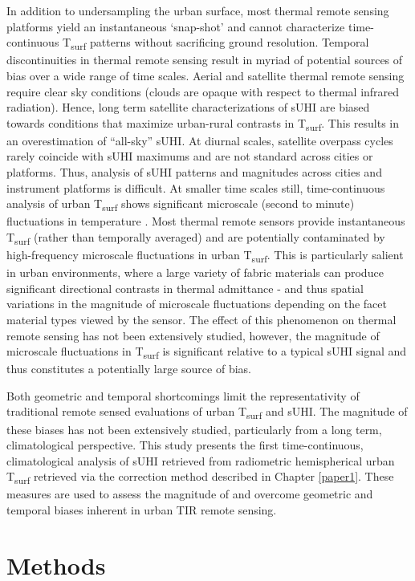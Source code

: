 In addition to undersampling the urban surface, most thermal remote sensing platforms yield an instantaneous ‘snap-shot’ and cannot characterize time-continuous T\textsubscript{surf} patterns without sacrificing ground resolution. Temporal discontinuities in thermal remote sensing result in myriad of potential sources of bias over a wide range of time scales. Aerial and satellite thermal remote sensing require clear sky conditions (clouds are opaque with respect to thermal infrared radiation). Hence, long term satellite characterizations of sUHI are biased towards conditions that maximize urban-rural contrasts in T\textsubscript{surf}. This results in an overestimation of “all-sky” sUHI. At diurnal scales, satellite overpass cycles rarely coincide with sUHI maximums and are not standard across cities or platforms. Thus, analysis of sUHI patterns and magnitudes across cities and instrument platforms is difficult. At smaller time scales still, time-continuous analysis of urban T\textsubscript{surf} shows significant microscale (second to minute) fluctuations in temperature \citep{Christen2012}. Most thermal remote sensors provide instantaneous T\textsubscript{surf} (rather than temporally averaged) and are potentially contaminated by high-frequency microscale fluctuations in urban T\textsubscript{surf}. This is particularly salient in urban environments, where a large variety of fabric materials can produce significant directional contrasts in thermal admittance - and thus spatial variations in the magnitude of microscale fluctuations depending on the facet material types viewed by the sensor. The effect of this phenomenon on thermal remote sensing has not been extensively studied, however, the magnitude of microscale fluctuations in T\textsubscript{surf} is significant relative to a typical sUHI signal and thus constitutes a potentially large source of bias.

Both geometric and temporal shortcomings limit the representativity of traditional remote sensed evaluations of urban T\textsubscript{surf} and sUHI. The magnitude of these biases has not been extensively studied, particularly from a long term, climatological perspective. This study presents the first time-continuous, climatological analysis of sUHI retrieved from radiometric hemispherical urban T\textsubscript{surf} retrieved via the correction method described in Chapter \ref{paper1}. These measures are used to assess the magnitude of and overcome geometric and temporal biases inherent in urban TIR remote sensing.

\section{Methods}

